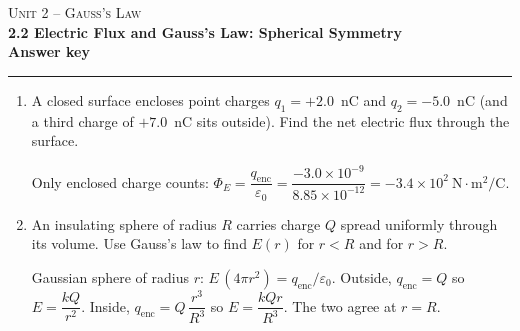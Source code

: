 \documentclass[11pt,letterpaper]{article}
\begin{document}
{\small\textsc{Unit 2 -- Gauss's Law}}\\[2pt]{\Large\bfseries 2.2 Electric Flux and Gauss's Law: Spherical Symmetry}\\[8pt]\textbf{Answer key}\\[4pt]\hrule\vspace{10pt}{\small\itshape Placeholder worksheet for the site prototype. Free for classroom use.}\vspace{6pt}
\begin{enumerate}[leftmargin=*,itemsep=10pt]
\item A closed surface encloses point charges $q_1 = +2.0$~nC and $q_2 = -5.0$~nC (and a third charge of $+7.0$~nC sits outside). Find the net electric flux through the surface.
\begin{answer}Only enclosed charge counts: $\Phi_E = \dfrac{q_{\text{enc}}}{\varepsilon_0} = \dfrac{-3.0\times10^{-9}}{8.85\times10^{-12}} = -3.4\times10^{2}\ \text{N}\cdot\text{m}^2/\text{C}$.\end{answer}
\item An insulating sphere of radius $R$ carries charge $Q$ spread uniformly through its volume. Use Gauss's law to find $E(r)$ for $r<R$ and for $r>R$.
\begin{answer}Gaussian sphere of radius $r$: $E\,(4\pi r^2) = q_{\text{enc}}/\varepsilon_0$. Outside, $q_{\text{enc}} = Q$ so $E = \dfrac{kQ}{r^2}$. Inside, $q_{\text{enc}} = Q\,\dfrac{r^3}{R^3}$ so $E = \dfrac{kQr}{R^3}$. The two agree at $r = R$.\end{answer}
\end{enumerate}
\end{document}
